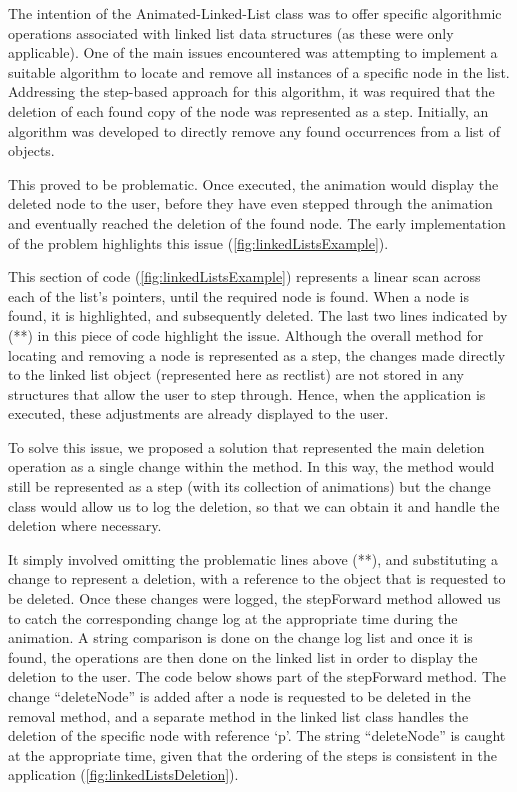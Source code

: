 \documentclass{l3proj}
\begin{document}
The intention of the Animated-Linked-List class was to offer specific algorithmic operations associated with linked list data structures (as these were only applicable). One of the main issues encountered was attempting to implement a suitable algorithm to locate and remove all instances of a specific node in the list. Addressing the step-based approach for this algorithm, it was required that the deletion of each found copy of the node was represented as a step. Initially, an algorithm was developed to directly remove any found occurrences from a list of objects.



This proved to be problematic. Once executed, the animation would display the deleted node to the user, before they have even stepped through the animation and eventually reached the deletion of the found node. The early implementation of the problem highlights this issue (\ref{fig:linkedListsExample}).

This section of code (\ref{fig:linkedListsExample}) represents a linear scan across each of the list’s pointers, until the required node is found. When a node is found, it is highlighted, and subsequently deleted. The last two lines indicated by (**) in this piece of code highlight the issue. Although the overall method for locating and removing a node is represented as a step, the changes made directly to the linked list object (represented here as rectlist) are not stored in any structures that allow the user to step through. Hence, when the application is executed, these adjustments are already displayed to the user. 

To solve this issue, we proposed a solution that represented the main deletion operation as a single change within the method. In this way, the method would still be represented as a step (with its collection of animations) but the change class would allow us to log the deletion, so that we can obtain it and handle the deletion where necessary.



It simply involved omitting the problematic lines above (**), and substituting a change to represent a deletion, with a reference to the object that is requested to be deleted. Once these changes were logged, the stepForward method allowed us to catch the corresponding change log at the appropriate time during the animation. A string comparison is done on the change log list and once it is found, the operations are then done on the linked list in order to display the deletion to the user. The code below shows part of the stepForward method. The change “deleteNode” is added after a node is requested to be deleted in the removal method, and a separate method in the linked list class handles the deletion of the specific node with reference ‘p’. The string “deleteNode” is caught at the appropriate time, given that the ordering of the steps is consistent in the application (\ref{fig:linkedListsDeletion}).
\end{document}
